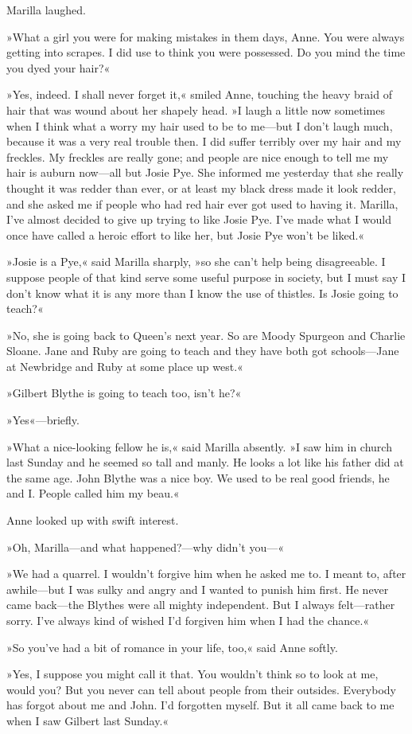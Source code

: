 Marilla laughed.

»What a girl you were for making mistakes in them days, Anne. You were always getting into scrapes. I did use to think you were possessed. Do you mind the time you dyed your hair?«

»Yes, indeed. I shall never forget it,« smiled Anne, touching the heavy braid of hair that was wound about her shapely head. »I laugh a little now sometimes when I think what a worry my hair used to be to me—but I don't laugh much, because it was a very real trouble then. I did suffer terribly over my hair and my freckles. My freckles are really gone; and people are nice enough to tell me my hair is auburn now—all but Josie Pye. She informed me yesterday that she really thought it was redder than ever, or at least my black dress made it look redder, and she asked me if people who had red hair ever got used to having it. Marilla, I've almost decided to give up trying to like Josie Pye. I've made what I would once have called a heroic effort to like her, but Josie Pye won't be liked.«

»Josie is a Pye,« said Marilla sharply, »so she can't help being disagreeable. I suppose people of that kind serve some useful purpose in society, but I must say I don't know what it is any more than I know the use of thistles. Is Josie going to teach?«

»No, she is going back to Queen's next year. So are Moody Spurgeon and Charlie Sloane. Jane and Ruby are going to teach and they have both got schools—Jane at Newbridge and Ruby at some place up west.«

»Gilbert Blythe is going to teach too, isn't he?«

»Yes«—briefly.

»What a nice-looking fellow he is,« said Marilla absently. »I saw him in church last Sunday and he seemed so tall and manly. He looks a lot like his father did at the same age. John Blythe was a nice boy. We used to be real good friends, he and I. People called him my beau.«

Anne looked up with swift interest.

»Oh, Marilla—and what happened?—why didn't you—«

»We had a quarrel. I wouldn't forgive him when he asked me to. I meant to, after awhile—but I was sulky and angry and I wanted to punish him first. He never came back—the Blythes were all mighty independent. But I always felt—rather sorry. I've always kind of wished I'd forgiven him when I had the chance.«

»So you've had a bit of romance in your life, too,« said Anne softly.

»Yes, I suppose you might call it that. You wouldn't think so to look at me, would you? But you never can tell about people from their outsides. Everybody has forgot about me and John. I'd forgotten myself. But it all came back to me when I saw Gilbert last Sunday.«